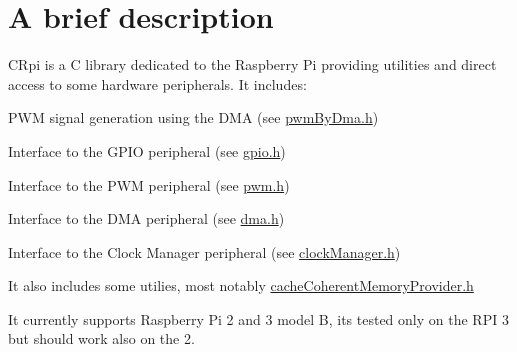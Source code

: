 \hypertarget{index_intro_sec}{}\section{A brief description}\label{index_intro_sec}
C\+Rpi is a C library dedicated to the Raspberry Pi providing utilities and direct access to some hardware peripherals. It includes\+:
\begin{DoxyItemize}
\item P\+WM signal generation using the D\+MA (see \hyperlink{pwmByDma_8h}{pwm\+By\+Dma.\+h})
\item Interface to the G\+P\+IO peripheral (see \hyperlink{gpio_8h}{gpio.\+h})
\item Interface to the P\+WM peripheral (see \hyperlink{pwm_8h}{pwm.\+h})
\item Interface to the D\+MA peripheral (see \hyperlink{dma_8h}{dma.\+h})
\item Interface to the Clock Manager peripheral (see \hyperlink{clockManager_8h}{clock\+Manager.\+h})
\end{DoxyItemize}

It also includes some utilies, most notably \hyperlink{cacheCoherentMemoryProvider_8h}{cache\+Coherent\+Memory\+Provider.\+h}

It currently supports Raspberry Pi 2 and 3 model B, it\textquotesingle{}s tested only on the R\+PI 3 but should work also on the 2. 